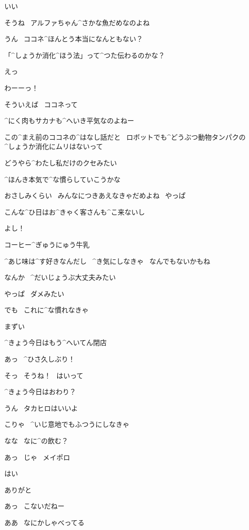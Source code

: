 \Alpha いい

\Kokone そうね
\ アルファちゃん^{さかな}{魚}だめなのよね

\Alpha うん
\ ココネ^{ほんとう}{本当}になんともない？

\Kokone 「^{しょうか}{消化}^{ほう}{法}」って^{つた}{伝}わるのかな？

\Alpha えっ

\Alpha わーーっ！

\page[55]
\Alpha そういえば
\ ココネって

\Alpha ^{にく}{肉}もサカナも^{へいき}{平気}なのよねー

\Alpha この^{まえ}{前}のココネの^{はなし}{話}だと
\ ロボットでも^{どうぶつ}{動物}タンパクの^{しょうか}{消化}にムリはないって

\Alpha どうやら^{わたし}{私}だけのクセみたい

\page
\Alpha ^{ほんき}{本気}で^{な}{慣}らしていこうかな

\Alpha おさしみくらい
\ みんなにつきあえなきゃだめよね
\ やっぱ

\Alpha こんな^{ひ}{日}はお^{きゃく}{客}さんも^{こ}{来}ないし

\Alpha よし！

\page
\Sign コーヒー^{ぎゅうにゅう}{牛乳}

\Alpha ^{あじ}{味}は^{す}{好}きなんだし
\ ^{き}{気}にしなきゃ
\ なんでもないかもね

\page
\Alpha なんか
\ ^{だいじょうぶ}{大丈夫}みたい

\page
\Alpha やっぱ
\ ダメみたい

\Alpha でも
\ これに^{な}{慣}れなきゃ

\Alpha まずい

\Alpha ^{きょう}{今日}はもう^{へいてん}{閉店}

\page
\Takahiro あっ
\ ^{ひさ}{久}しぶり！

\Alpha そっ
\ そうね！
\ はいって

\Takahiro ^{きょう}{今日}はおわり？

\Alpha うん
\ タカヒロはいいよ

\page
\Alpha こりゃ
\ ^{いじ}{意地}でもふつうにしなきゃ

\Alpha なな
\ なに^{の}{飲}む？

\Takahiro あっ
\ じゃ
\ メイポロ

\Alpha はい

\Takahiro ありがと

\page
\Takahiro あっ
\ こないだねー

\Alpha ああ
\ なにかしゃべってる

